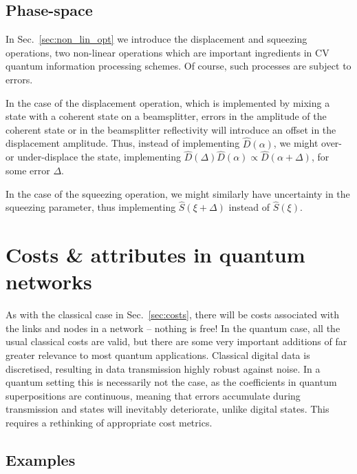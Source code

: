 \documentclass[aps,rmp,twocolumn,amsmath,amssymb,nofootinbib,superscriptaddress,longbibliography,floatfix,table-of-contents,eqsecnum]{revtex4-1}
\begin{document}
%
%

\subsection{Phase-space} 

In Sec.~\ref{sec:non_lin_opt} we introduce the displacement and squeezing operations, two non-linear operations which are important ingredients in CV quantum information processing schemes. Of course, such processes are subject to errors.

In the case of the displacement operation, which is implemented by mixing a state with a coherent state on a beamsplitter, errors in the amplitude of the coherent state or in the beamsplitter reflectivity will introduce an offset in the displacement amplitude. Thus, instead of implementing $\hat{D}(\alpha)$, we might over- or under-displace the state, implementing \mbox{$\hat{D}(\Delta)\hat{D}(\alpha)\propto \hat{D}(\alpha+\Delta)$}, for some error $\Delta$.

In the case of the squeezing operation, we might similarly have uncertainty in the squeezing parameter, thus implementing $\hat{S}(\xi+\Delta)$ instead of $\hat{S}(\xi)$.

%
%

\section{Costs \& attributes in quantum networks} \label{sec:quantum_meas_cost}
As with the classical case in Sec.~\ref{sec:costs}, there will be costs associated with the links and nodes in a network -- nothing is free! In the quantum case, all the usual classical costs are valid, but there are some very important additions of far greater relevance to most quantum applications. Classical digital data is discretised, resulting in data transmission highly robust against noise. In a quantum setting this is necessarily not the case, as the coefficients in quantum superpositions are continuous, meaning that errors accumulate during transmission and states will inevitably deteriorate, unlike digital states. This requires a rethinking of appropriate cost metrics.

%
%

\subsection{Examples}
\end{document}
